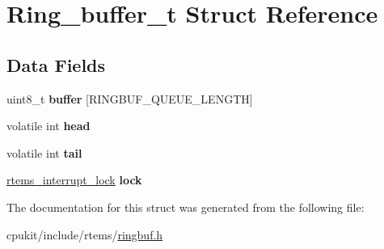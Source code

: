 \hypertarget{structRing__buffer__t}{}\section{Ring\+\_\+buffer\+\_\+t Struct Reference}
\label{structRing__buffer__t}
\subsection*{Data Fields}
\begin{DoxyCompactItemize}
\item 
\mbox{\label{structRing__buffer__t_a5ba3a1cad0e4d323f6e99415822169df}} 
uint8\+\_\+t {\bfseries buffer} \mbox{[}R\+I\+N\+G\+B\+U\+F\+\_\+\+Q\+U\+E\+U\+E\+\_\+\+L\+E\+N\+G\+TH\mbox{]}
\item 
\mbox{\label{structRing__buffer__t_aec75ae389a5c4a4d0f234b5c07ce85c3}} 
volatile int {\bfseries head}
\item 
\mbox{\label{structRing__buffer__t_a708d214bae4bf8de22cff36f496191d6}} 
volatile int {\bfseries tail}
\item 
\mbox{\label{structRing__buffer__t_a147f017b65eeda5466f1a548a76cd14f}} 
\mbox{\hyperlink{group__ClassicINTRLocks_ga7d4b54b01fd1507aa842d5fbc7b11177}{rtems\+\_\+interrupt\+\_\+lock}} {\bfseries lock}
\end{DoxyCompactItemize}


The documentation for this struct was generated from the following file\+:\begin{DoxyCompactItemize}
\item 
cpukit/include/rtems/\mbox{\hyperlink{ringbuf_8h}{ringbuf.\+h}}\end{DoxyCompactItemize}
